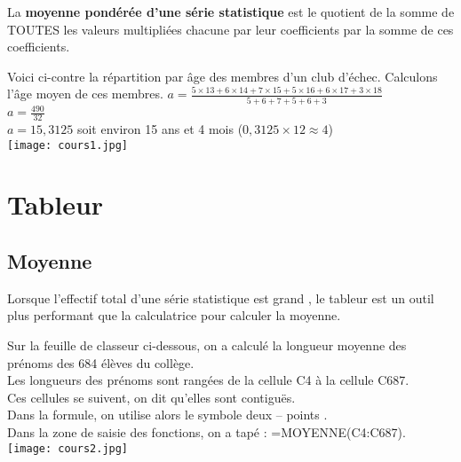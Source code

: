 \documentclass[10pt]{article}
\begin{document}
{\begin{Df}
La \textbf{moyenne pondérée d’une série statistique} est le quotient de la somme
de TOUTES les valeurs multipliées chacune par leur coefficients
par la somme de ces coefficients.
\end{Df}


\begin{Ex}
\begin{multicols}{2}
Voici ci-contre la répartition par âge des membres d'un club d'échec.
Calculons l'âge moyen de ces membres.
	$a =\frac{5\times 13+6\times 14+7\times 15+5\times 16+6\times 17+3\times 18}{5+6+7+5+6+3}$\\  
	$a =\frac{490}{32}$\\ 
	$a = 15,3125$ \hspace{0.1cm}		soit environ 15 ans et 4 mois ($0,3125 \times 12 \approx 4$)\\

\texttt{[image: cours1.jpg]} 
\end{multicols}	
\end{Ex}
\section{Tableur}
\subsection{Moyenne}
\begin{shaded}
Lorsque l'effectif total d'une série statistique est \og  grand \fg{},
le tableur est un outil plus performant que la calculatrice pour calculer la moyenne.
\end{shaded}

\begin{Ex}
Sur la feuille de classeur ci-dessous,
on a calculé la longueur moyenne des prénoms des 684 élèves du collège.\\
		Les longueurs des prénoms sont rangées de la cellule C4 à la cellule C687.\\
		Ces cellules se suivent, on dit qu'elles sont contiguës.\\
		Dans la formule, on utilise alors le symbole \og  deux – points \fg{}.\\
		Dans la zone de saisie des fonctions, on a tapé : =MOYENNE(C4:C687).\\
		
\texttt{[image: cours2.jpg]} 		
		
\end{Ex}


}
\end{document}
